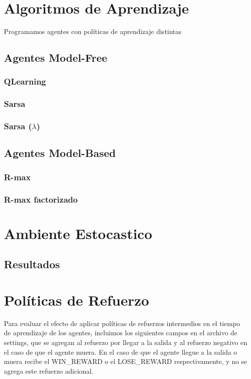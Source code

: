 \documentclass[a4paper,spanish] {article}
\begin{document}
\section{Algoritmos de Aprendizaje}
	Programamos agentes con pol\'iticas de aprendizaje distintas 
	\subsection{Agentes Model-Free}
		\subsubsection{QLearning}
		\subsubsection{Sarsa}
		\subsubsection{Sarsa ($\lambda$)}	
	\subsection{Agentes Model-Based}	
		\subsubsection{R-max}
		\subsubsection{R-max factorizado}

\section{Ambiente Estocastico}
	\subsection{Resultados}
	
 \section{Pol\'iticas de Refuerzo}
 	Para evaluar el efecto de aplicar pol\'iticas de refuerzos intermedios en el tiempo de aprendizaje de los agentes, incluimos los siguientes campos en el archivo de settings, que se agregan al refuerzo por llegar a la salida y al refuerzo negativo en el caso de que el agente muera. En el caso de que el agente llegue a la salida o muera recibe el WIN\_REWARD o el LOSE\_REWARD respectivamente, y no se agrega este refuerzo adicional.
\end{document}
